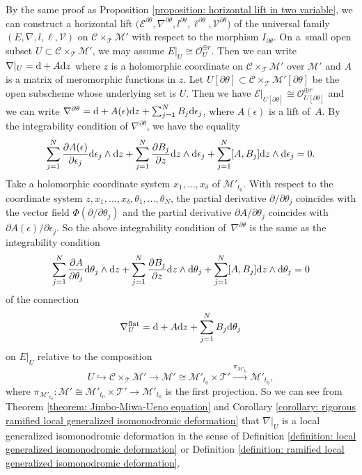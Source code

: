 \documentclass[pdftex]{sigma}
\numberwithin{equation}{section}
\begin{document}
By the same proof as Proposition \ref{proposition: horizontal lift in two variable},
we can construct a horizontal lift
$\big({\mathcal E}^{\partial\theta} ,\nabla^{\partial\theta} ,l^{\partial\theta} ,
\ell^{\partial\theta} ,\allowbreak {\mathcal V}^{\partial \theta}\big)$
of the universal family
$(E,\nabla,l,\ell,{\mathcal V})$
on ${\mathcal C}\times_{\mathcal T}{\mathcal M'}$
with respect to the morphism $I_{\partial\theta}$.
On a~small open subset
$U\subset {\mathcal C}\times_{\mathcal T}{\mathcal M'}$,
we may assume
$E|_U\cong{\mathcal O}_U^{\oplus r}$.
Then we can write
$\nabla|_U={\rm d}+A{\rm d}z$
where $z$ is a holomorphic coordinate on ${\mathcal C}\times_{\mathcal T}{\mathcal M'}$
over ${\mathcal M'}$ and $A$ is a matrix of meromorphic functions in $z$.
Let $U[\partial\theta]\subset {\mathcal C}\times_{\mathcal T}{\mathcal M'}[\partial\theta]$
be the open subscheme whose underlying set is $U$.
Then we have
${\mathcal E}|_{U[\partial\theta]}\cong{\mathcal O}_{U[\partial\theta]}^{\oplus r}$
and we can write
$\nabla^{\partial\theta}={\rm d}+A(\epsilon){\rm d}z+\sum_{j=1}^N B_j {\rm d}\epsilon_j$,
where $A(\epsilon)$ is a lift of~$A$.
By the integrability condition of $\nabla^{\partial\theta}$, we have the equality
\[
 \sum_{j=1}^N \frac{\partial A(\epsilon)}{\partial \epsilon_j}{\rm d}\epsilon_j\wedge {\rm d}z
 +\sum_{j=1}^N \frac{\partial B_j}{\partial z}{\rm d}z\wedge {\rm d}\epsilon_j
 +\sum_{j=1}^N [A,B_j]{\rm d}z\wedge {\rm d}\epsilon_j
 =0.
\]
Take a holomorphic coordinate system
$x_1,\dots,x_{\delta}$ of ${\mathcal M}'_{t_0}$.
With respect to the coordinate system
$z,x_1,\dots,x_{\delta},\theta_1,\dots,\theta_N$,
the partial derivative
$\partial/\partial \theta_j$ coincides with the vector field
$\Phi(\partial /\partial \theta_j)$
and the partial derivative $\partial A/\partial \theta_j$
coincides with
$\partial A(\epsilon)/\partial \epsilon_j$.
So the above integrability condition of~$\nabla^{\partial\theta}$ is the same as the
integrability condition
\[
 \sum_{j=1}^N \frac{\partial A}{\partial \theta_j}{\rm d}\theta_j\wedge {\rm d}z
 +\sum_{j=1}^N \frac{\partial B_j}{\partial z}{\rm d}z\wedge {\rm d}\theta_j
 +\sum_{j=1}^N [A,B_j]{\rm d}z\wedge {\rm d}\theta_j=0
\]
of the connection
\[
 \nabla_U^{\rm flat}={\rm d}+A{\rm d}z+\sum_{j=1}^NB_j{\rm d}\theta_j
\]
on $E|_U$ relative to the composition
\[
U\hookrightarrow{\mathcal C}\times_{\mathcal T}{\mathcal M'}
 \longrightarrow
 {\mathcal M'}\cong{\mathcal M}'_{t_0}\times{\mathcal T'}
 \xrightarrow{\pi_{{\mathcal M}'_{t_0}}} {\mathcal M}'_{t_0},
 \]
where
$\pi_{{\mathcal M}'_{t_0}}\colon
{\mathcal M'}\cong{\mathcal M}'_{t_0}\times{\mathcal T'}
\longrightarrow {\mathcal M}'_{t_0}$
is the first projection.
So we can see from Theorem \ref{theorem: Jimbo-Miwa-Ueno equation}
and Corollary \ref{corollary: rigorous ramified local generalized isomonodromic deformation}
that $\nabla|_U$ is a local generalized isomonodromic deformation
in the sense of Definition \ref{definition: local generalized isomonodromic deformation}
or Definition \ref{definition: ramified local generalized isomonodromic deformation}.
\end{document}
